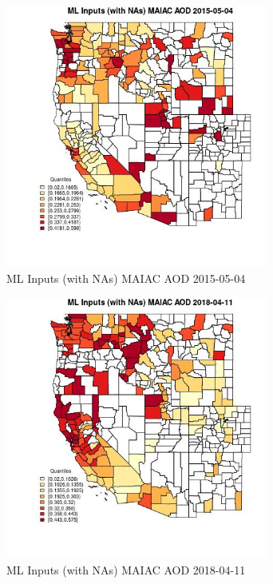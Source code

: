 \begin{figure} 
\centering  
\includegraphics[width=0.77\textwidth]{Code_Outputs/Report_ML_input_PM25_Step4_part_e_de_duplicated_aves_compiled_2019-05-18wNAs_CountyMAIAC_AODMean2015-05-04_2015-05-04.jpg} 
\caption{\label{fig:Report_ML_input_PM25_Step4_part_e_de_duplicated_aves_compiled_2019-05-18wNAsCountyMAIAC_AODMean2015-05-04_2015-05-04}ML Inputs (with NAs) MAIAC AOD 2015-05-04} 
\end{figure} 
 

\begin{figure} 
\centering  
\includegraphics[width=0.77\textwidth]{Code_Outputs/Report_ML_input_PM25_Step4_part_e_de_duplicated_aves_compiled_2019-05-18wNAs_CountyMAIAC_AODMean2018-04-11_2018-04-11.jpg} 
\caption{\label{fig:Report_ML_input_PM25_Step4_part_e_de_duplicated_aves_compiled_2019-05-18wNAsCountyMAIAC_AODMean2018-04-11_2018-04-11}ML Inputs (with NAs) MAIAC AOD 2018-04-11} 
\end{figure} 
 

